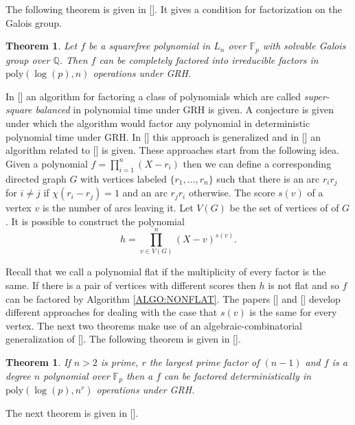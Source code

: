 \documentclass{article}
\newcounter{dummy} \numberwithin{dummy}{section}
\theoremstyle{plain}
\newtheorem{thm}[dummy]{Theorem}
\theoremstyle{definition}
\def\Fp {{ \mathbb{F} _ {p} }}
\def\poly {{ \mathrm{poly} }}
\begin{document}
		    The following theorem is given in []. It gives a condition for factorization on the Galois group.

		    \begin{thm}
				\label{THM:GALOIS}
			      Let $f$ be a squarefree polynomial in $L_n$ over $\Fp$ with solvable Galois group over $\mathbb{Q}$. Then $f$ can be completely factored into irreducible factors in $\poly(\log(p), n)$ operations under GRH. 
		    \end{thm}
		
		    In [] an algorithm for factoring a class of polynomials which are called \emph{super-square balanced} in polynomial time under GRH is given. A conjecture is given under which the algorithm would factor any polynomial in deterministic polynomial time under GRH. In [] this approach is generalized and in [] an algorithm related to [] is given. These approaches start from the following idea. Given a polynomial $f=\prod_{i=1}^n{(X-r_i)}$ then we can define a corresponding directed graph $G$ with vertices labeled $\{r_1,\ldots,r_n \}$ such that there is an arc $r_ir_j$ for $i \not=j$ if $\chi(r_i-r_j)=1$ and an arc $r_jr_i$ otherwise. 
				The score $s(v)$ of a vertex $v$ is the number of arcs leaving it. Let $V(G)$ be the set of vertices of of $G$. It is possible to construct the polynomial 
		    \[ h = \prod_{v \in V(G)}^n{(X-v)}^{s(v)}. \]
		
		    Recall that we call a polynomial flat if the multiplicity of every factor is the same. If there is a pair of vertices with different scores then $h$ is not flat and so $f$ can be factored by Algorithm \ref{ALGO:NONFLAT}. The papers [] and [] develop different approaches for dealing with the case that $s(v)$ is the same for every vertex. 
				The next two theorems make use of an algebraic-combinatorial generalization of []. The following theorem is given in [].

		    \begin{thm}
				\label{THM:PrimeDeg}
			      If $n>2$ is prime, $r$ the largest prime factor of $(n-1)$ and $f$ is a degree $n$ polynomial over $\Fp$ then a $f$ can be factored deterministically in $\poly(\log( p), n^r)$ operations under GRH.
		    \end{thm}
				
				The next theorem is given in [].
				
\end{document}
